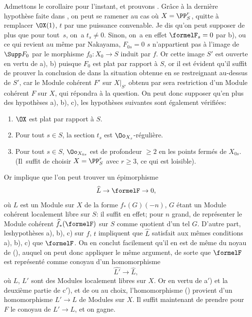 Admettons le corollaire pour l'instant, et prouvons . Gr\^ace \`a la derni\`ere hypoth\`ese faite dans , on peut se ramener au cas o\`u $X=\PP^r_S$, quitte \`a remplacer $\OX(1)$, $t$ par une puissance convenable. Je dis qu'on peut supposer de plus que pour tout~$s$, on~a $t_s\neq 0$. Sinon, on~a en effet $\formelF_s=0$ par b), ou ce qui revient au m\^eme par Nakayama, $F_{0s}=0$ \ie $s$ n'appartient pas \`a l'image de $\Supp F_0$ par le morphisme $f_0:X_0\to S$ induit par $f$. Or cette image $S'$ est ouverte en vertu de a), b) puisque $F_0$ est plat par rapport \`a $S$, or il est \'evident qu'il suffit de prouver la conclusion de  dans la situation obtenue en se restreignant au-dessus de $S'$, car le Module coh\'erent $F'$ sur $X|_{S'}$ obtenu par sera restriction d'un Module coh\'erent $F$ sur $X$, qui r\'epondra \`a la question. On peut donc supposer qu'en plus des hypoth\`eses a), b), c), les hypoth\`eses suivantes sont \'egalement v\'erifi\'ees:
\begin{enumerate}
\item[\textup{a$'$)}] $\OX$ est plat par rapport \`a $S$.
\item[\textup{b$'$)}] Pour tout $s\in S$, la section $t_s$ est $\Oo_{X_s}$-r\'eguli\`ere.
\item[\textup{c$'$)}] Pour tout $s\in S$, $\Oo_{X_{0s}}$ est de profondeur $\geq 2$ en les points ferm\'es de $X_{0s}$. (Il~suffit de choisir $X=\PP_S^r$ avec $r\geq 3$, ce qui est loisible).
\end{enumerate}
Or  implique que l'on peut trouver un \'epimorphisme
\steco
\begin{equation} \label{eq:XII.17}
\widehat{L} \to \formelF \to 0,
\end{equation}
o\`u $L$ est un Module sur $X$ de la forme $f_\ast(G)(-n)$, $G$ \'etant un Module coh\'erent localement libre sur $S$: il suffit en effet; pour $n$ grand, de repr\'esenter le Module coh\'erent $\widehat{f}_\ast(\formelF)$ sur $S$ comme quotient d'un tel $G$. D'autre part, les\pageoriginale hypoth\`eses a), b), c) sur $f$, $t$ impliquent que $\widehat{L}$ satisfait aux m\^emes conditions a), b), c) que $\formelF$. On en conclut facilement qu'il en est de m\^eme du noyau de (), auquel on peut donc appliquer le m\^eme argument, de sorte que $\formelF$ est repr\'esent\'e comme conoyau d'un homomorphisme
\steco
\begin{equation} \label{eq:XII.18}
\widehat{L'} \to \widehat{L},
\end{equation}
o\`u $L$, $L'$ sont des Modules localement libres sur $X$. Or en vertu de a$'$) et la deuxi\`eme partie de c$'$), et de  ou  au choix, l'homomorphisme () provient d'un homomorphisme $L'\to L$ de Modules sur $X$. Il suffit maintenant de prendre pour $F$ le conoyau de $L'\to L$, et on gagne.

